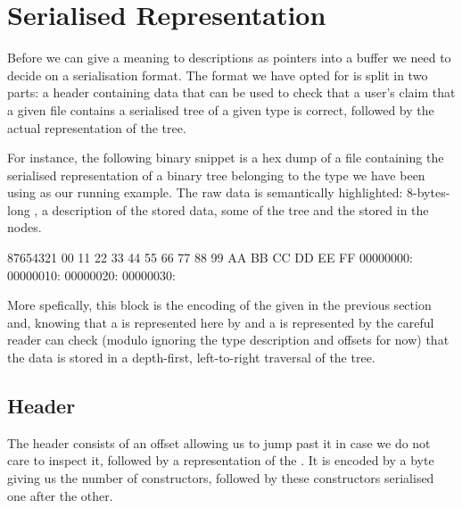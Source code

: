 \section{Serialised Representation}\label{sec:hexdump}

Before we can give a meaning to descriptions as pointers into a buffer we
need to decide on a serialisation format.
%
The format we have opted for is split in two parts: a header containing
data that can be used to check that a user's claim that a given file
contains a serialised tree of a given type is correct, followed by the
actual representation of the tree.


For instance, the following binary snippet is a hex dump of a file
containing the serialised representation of a binary tree belonging to
the type we have been using as our running example.
%
The raw data is semantically highlighted:
8-bytes-long ,
a  description of the stored data,
some  of the tree
and the  stored in the nodes.

\begin{hexdump}
87654321\hphantom{:} 00 11 22 33 44 55 66 77 88 99 AA BB CC DD EE FF
00000000:   
00000010:   
00000020:         
00000030:     
\end{hexdump}

More spefically, this block is the encoding of the 
given in the previous section and,
%
knowing that a  is represented here by 
and a  is represented by 
%
the careful reader can check
(modulo ignoring the type description and offsets for now)
that the data is stored in a depth-first, left-to-right traversal of the tree.


\subsection{Header}

The header consists of an offset allowing us to jump past it in case we do
not care to inspect it, followed by a representation of the .
%
It is encoded by a byte giving us the number of constructors, followed by
these constructors serialised one after the other.

